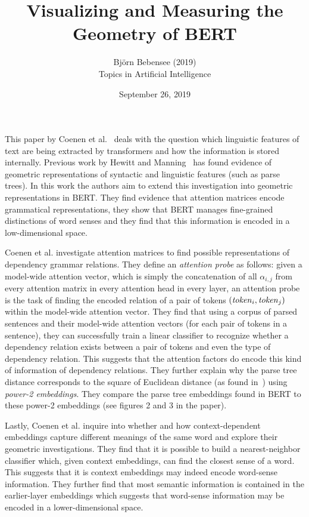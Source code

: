 \documentclass[12pt]{article}
\begin{document}
 
 
\title{Visualizing and Measuring the Geometry of BERT}
\author{Bj\"orn Bebensee (2019)\\ %
Topics in Artificial Intelligence}
\date{September 26, 2019}
\maketitle

\noindent
This paper by Coenen et al.~\cite{bert} deals with the question which linguistic features of text are being extracted by transformers and how the information is stored internally. Previous work by Hewitt and Manning~\cite{hewitt} has found evidence of geometric representations of syntactic and linguistic features (such as parse trees). In this work the authors aim to extend this investigation into geometric representations in BERT. They find evidence that attention matrices encode grammatical representations, they show that BERT manages fine-grained distinctions of word senses and they find that this information is encoded in a low-dimensional space.

Coenen et al. investigate attention matrices to find possible representations of dependency grammar relations. They define an \emph{attention probe} as follows: given a model-wide attention vector, which is simply the concatenation of all $\alpha_{i,j}$ from every attention matrix in every attention head in every layer, an attention probe is the task of finding the encoded relation of a pair of tokens $(\text{\emph{token}}_i, \text{\emph{token}}_j)$ within the model-wide attention vector. They find that using a corpus of parsed sentences and their model-wide attention vectors (for each pair of tokens in a sentence), they can successfully train a linear classifier to recognize whether a dependency relation exists between a pair of tokens and even the type of dependency relation. This suggests that the attention factors do encode this kind of information of dependency relations. They further explain why the parse tree distance corresponds to the square of Euclidean distance (as found in~\cite{hewitt}) using \emph{power-2 embeddings}. They compare the parse tree embeddings found in BERT to these power-2 embeddings (see figures 2 and 3 in the paper).

Lastly, Coenen et al. inquire into whether and how context-dependent embeddings capture different meanings of the same word and explore their geometric investigations. They find that it is possible to build a nearest-neighbor classifier which, given context embeddings, can find the closest sense of a word. This suggests that it is context embeddings may indeed encode word-sense information. They further find that most semantic information is contained in the earlier-layer embeddings which suggests that word-sense information may be encoded in a lower-dimensional space.
\end{document}
